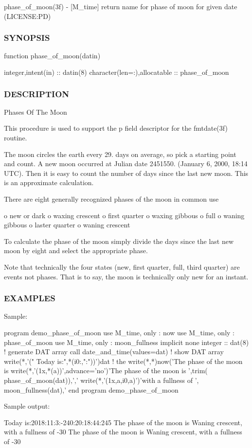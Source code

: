 phase\+\_\+of\+\_\+moon(3f) -\/ \mbox{[}M\+\_\+time\mbox{]} return name for phase of moon for given date (L\+I\+C\+E\+N\+SE\+:PD) \subsubsection*{S\+Y\+N\+O\+P\+S\+IS}

function phase\+\_\+of\+\_\+moon(datin)

integer,intent(in) \+:\+: datin(8) character(len=\+:),allocatable \+:\+: phase\+\_\+of\+\_\+moon

\subsubsection*{D\+E\+S\+C\+R\+I\+P\+T\+I\+ON}

Phases Of The Moon

This procedure is used to support the p field descriptor for the fmtdate(3f) routine.

The moon circles the earth every 29. days on average, so pick a starting point and count. A new moon occurred at Julian date 2451550. (January 6, 2000, 18\+:14 U\+TC). Then it is easy to count the number of days since the last new moon. This is an approximate calculation.

There are eight generally recognized phases of the moon in common use

o new or dark o waxing crescent o first quarter o waxing gibbous o full o waning gibbous o laster quarter o waning crescent

To calculate the phase of the moon simply divide the days since the last new moon by eight and select the appropriate phase.

Note that technically the four states (new, first quarter, full, third quarter) are events not phases. That is to say, the moon is technically only new for an instant.

\subsubsection*{E\+X\+A\+M\+P\+L\+ES}

\begin{DoxyVerb}Sample:

 program demo_phase_of_moon
 use M_time, only : now
 use M_time, only : phase_of_moon
 use M_time, only : moon_fullness
 implicit none
 integer             :: dat(8)
    ! generate DAT array
    call date_and_time(values=dat)
    ! show DAT array
    write(*,'(" Today is:",*(i0:,":"))')dat
    ! the %
    write(*,*)now('The phase of the moon is %
    write(*,'(1x,*(a))',advance='no')'The phase of the moon is ',trim( phase_of_moon(dat)),','
    write(*,'(1x,a,i0,a)')'with a fullness of ', moon_fullness(dat),'%
 end program demo_phase_of_moon

Sample output:

 Today is:2018:11:3:-240:20:18:44:245
 The phase of the moon is Waning crescent, with a fullness of -30%
 The phase of the moon is Waning crescent, with a fullness of -30%
\end{DoxyVerb}



